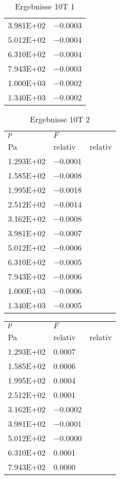 \begin{table}
\begin{tabular}{l l }
\num{3.981E+02}&\num{-0.0003}\\
\num{5.012E+02}&\num{-0.0004}\\
\num{6.310E+02}&\num{-0.0004}\\
\num{7.943E+02}&\num{-0.0003}\\
\num{1.000E+03}&\num{-0.0002}\\
\num{1.340E+03}&\num{-0.0002}\\
\bottomrule
\end{tabular}\caption{Ergebnisse 10T 1}\end{table}\begin{table}\begin{tabular}{l l }
\toprule
$p$&$F$\\
 Pa & relativ & relativ\\\midrule
\num{1.293E+02}&\num{-0.0001}\\
\num{1.585E+02}&\num{-0.0008}\\
\num{1.995E+02}&\num{-0.0018}\\
\num{2.512E+02}&\num{-0.0014}\\
\num{3.162E+02}&\num{-0.0008}\\
\num{3.981E+02}&\num{-0.0007}\\
\num{5.012E+02}&\num{-0.0006}\\
\num{6.310E+02}&\num{-0.0005}\\
\num{7.943E+02}&\num{-0.0006}\\
\num{1.000E+03}&\num{-0.0006}\\
\num{1.340E+03}&\num{-0.0005}\\
\bottomrule
\end{tabular}\caption{Ergebnisse 10T 2}\end{table}\begin{table}\begin{tabular}{l l }
\toprule
$p$&$F$\\
 Pa & relativ & relativ\\\midrule
\num{1.293E+02}&\num{0.0007}\\
\num{1.585E+02}&\num{0.0006}\\
\num{1.995E+02}&\num{0.0004}\\
\num{2.512E+02}&\num{0.0001}\\
\num{3.162E+02}&\num{-0.0002}\\
\num{3.981E+02}&\num{-0.0001}\\
\num{5.012E+02}&\num{-0.0000}\\
\num{6.310E+02}&\num{0.0001}\\
\num{7.943E+02}&\num{0.0000}\\

\end{tabular}
\end{table}
